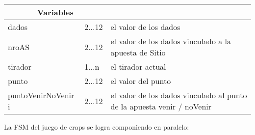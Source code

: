 \begin{center}
    \begin{tabular}{p{4cm}|p{4cm}|p{12cm}}        
        \multicolumn{2}{c}{Variables}\\
        \hline
        dados & 2...12 & el valor de los dados\\
        \hline
        nroAS & 2...12 & el valor de los dados vinculado a la apuesta de Sitio\\
        \hline
        tirador & 1...n & el tirador actual\\
        \hline
        punto & 2...12 & el valor del punto\\
        \hline
        puntoVenirNoVenir i & 2...12 & el valor de los dados vinculado al punto de la apuesta venir / noVenir\\
        \hline
    \end{tabular}
\end{center}
 





La FSM del juego de craps se logra componiendo en paralelo:


